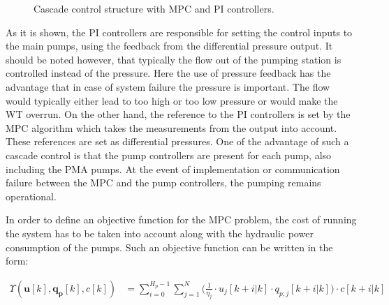 
\begin{figure}[H]
\centering
 
\caption{Cascade control structure with MPC and PI controllers.}
\label{fig:control_structure}
\end{figure}

As it is shown, the PI controllers are responsible for setting the control inputs to the main pumps, using the feedback from the differential pressure output. It should be noted however, that typically the flow out of the pumping station is controlled instead of the pressure. Here the use of pressure feedback has the advantage that in case of system failure the pressure is important. The flow would typically either lead to too high or too low pressure or would make the WT overrun. On the other hand, the reference to the PI controllers is set by the MPC algorithm which takes the measurements from the output into account. These references are set as differential pressures. One of the advantage of such a cascade control is that the pump controllers are present for each pump, also including the PMA pumps. At the event of implementation or communication failure between the MPC and the pump controllers, the pumping remains operational. 
 



In order to define an objective function for the MPC problem, the cost of running the system has to be taken into account along with the hydraulic power consumption of the pumps. Such an objective function can be written in the form: 

\begin{align}
 \Upsilon(\pmb{u}[k],\pmb{q_p}[k],c[k]) &=  \sum_{i=0}^{H_p-1} \sum_{j=1}^{N} \Big(\frac{1}{\eta_j} \cdot u_j[k+i|k] \cdot  q_{p;j}[k+i|k]\Big)\cdot c[k+i|k] \label{eqcost} 
\end{align}


